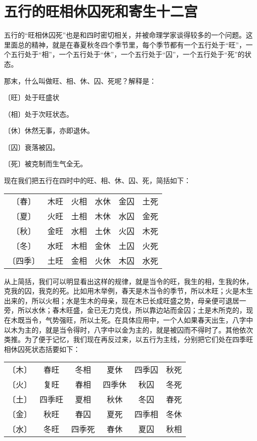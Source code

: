 \documentclass[a5paper,oneside,12pt]{ctexbook}
\begin{document}
\section{五行的旺相休囚死和寄生十二宫}
五行的“旺相休囚死”也是和四时密切相关，并被命理学家谈得较多的一个问题。这里面总的精神，就是在春夏秋冬四个季节里，每个季节都有一个五行处于“旺”，一个五行处于“相”，一个五行处于“休”，一个五行处于“囚”，一个五行处于“死”的状态。

那末，什么叫做旺、相、休、囚、死呢？解释是：

〔旺〕处于旺盛状\par
（相〕处于次旺状态。\par
〔休〕休然无事，亦即退休。\par
〔囚〕衰落被囚。\par
〔死〕被克制而生气全无。

现在我们把五行在四时中的旺、相、休、囚、死，简括如下：
\begin{table}[H]
\centering
\setlength{\tabcolsep}{0.5em} %
\begin{tabular}{cccccc}
〔春〕&木旺&火相&水休&金囚&土死\\
〔夏〕&火旺&土相&木休&水囚&金死\\
〔秋〕&金旺&水相&土休&火囚&木死\\
〔冬〕&水旺&木相&金休&土囚&火死\\
〔四季〕&土旺&金相&火休&木囚&水死
\end{tabular}
\end{table}


从上简括，我们可以明显看出这样的规律，就是当令的旺，我生的相，生我的休，克我的囚，我克的死。比如用木举例，春天是木当令的季节，所以木旺；火是木生出来的，所以火相；水是生木的母亲，现在木已长成旺盛之势，母亲便可退居一旁，所以水休；春木旺盛，金已无力克伐，所以靠边站而金囚；土是木所克的，现在木既当令，气势强旺，所以土死。在具体应用中，一个人如果春天出生，八字中以木为主的，就是当令得时，八字中以金为主的，就是被囚而不得时了。其他依次类推。为了便于记忆，我们现在再反过来，以五行为主线，分别把它们处在四季旺相休囚死状态括要如下：
\begin{table}[H]
\centering
\setlength{\tabcolsep}{0.5em} %
\begin{tabular}{cccccc}
〔木〕&春旺&冬相&夏休&四季囚&秋死\\
〔火〕&复旺&春相&四季休&秋囚&冬死\\
〔土〕&四季旺&夏相&秋休&冬囚&春死\\
〔金〕&秋旺&春囚&夏死&四季相&冬休\\
〔水〕&冬旺&四季死&春休&夏囚&秋相\\
\end{tabular}
\end{table}
\end{document}
